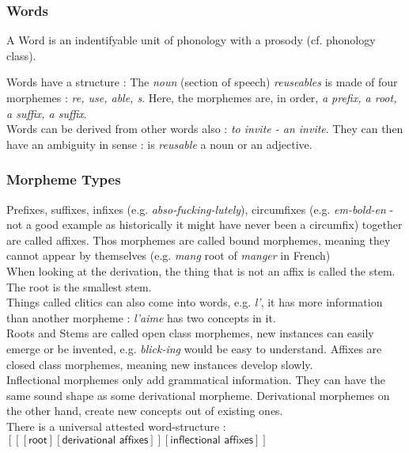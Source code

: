 \documentclass{cours}
\begin{document}
\subsubsection{Words}
A Word is an indentifyable unit of phonology with a prosody (cf. phonology class).

Words have a structure\! : The \emph{noun} (section of speech) \textsl{reuseables} is made of four morphemes\! : \textsl{re, use, able, s}. Here, the morphemes are, in order, \textsl{a prefix, a root, a suffix, a suffix}. \\
Words can be derived from other words also\! : \textsl{to invite - an invite}. They can then have an ambiguity in sense\! : is \textsl{reusable} a noun or an adjective.\\

\subsubsection{Morpheme Types}
Prefixes, suffixes, infixes (e.g. \textsl{abso-\emph{fucking}-lutely}), circumfixes (e.g. \textsl{\emph{em}-bold-\emph{en}} - not a good example as historically it might have never been a circumfix) together are called affixes. Thos morphemes are called bound morphemes, meaning they cannot appear by themselves (e.g. \textsl{mang} root of \textit{manger} in French)\\  
When looking at the derivation, the thing that is not an affix is called the stem. The root is the smallest stem. \\
Things called clitics can also come into words, e.g. \textsl{l'}, it has more information than another morpheme\! : \textsl{l'aime} has two concepts in it.\\
Roots and Stems are called open class morphemes, new instances can easily emerge or be invented, e.g. \textsl{blick-ing} would be easy to understand. Affixes are closed class morphemes, meaning new instances develop slowly.\\

Inflectional morphemes only add grammatical information. They can have the same sound shape as some derivational morpheme. Derivational morphemes on the other hand, create new concepts out of existing ones.\\

There is a universal attested word-structure\! : $\left[\left[\left[\textsf{root}\right]\left[\textsf{derivational affixes}\right]\right]\left[\textsf{inflectional affixes}\right]\right]$
\end{document}
